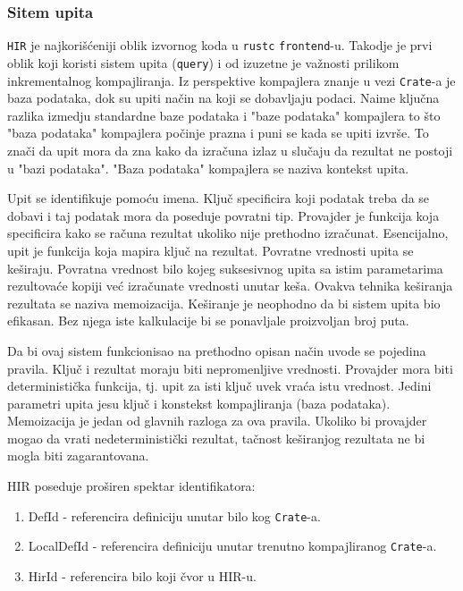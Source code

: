\documentclass[11pt]{article}
\begin{document}
\subsubsection{Sitem upita}

\verb|HIR| je najkorišćeniji oblik izvornog koda u \verb|rustc| \verb|frontend|-u. Takodje je prvi oblik koji 
koristi sistem upita (\verb|query|) i od izuzetne je važnosti prilikom inkrementalnog kompajliranja.
Iz perspektive kompajlera znanje u vezi \verb|Crate|-a je baza podataka, dok su upiti način na koji 
se dobavljaju podaci. Naime ključna razlika izmedju standardne baze podataka i "baze podataka" kompajlera
to što "baza podataka" kompajlera počinje prazna i puni se kada se upiti izvrše. To znači da upit mora 
da zna kako da izračuna izlaz u slučaju da rezultat ne postoji u "bazi podataka". "Baza podataka" kompajlera 
se naziva kontekst upita.

Upit se identifikuje pomoću imena. Ključ specificira koji podatak treba da se dobavi i taj podatak 
mora da poseduje povratni tip. Provajder je funkcija koja specificira kako se računa rezultat ukoliko nije 
prethodno izračunat. Esencijalno, upit je funkcija koja mapira ključ na rezultat. 
Povratne vrednosti upita se keširaju. Povratna vrednost bilo kojeg suksesivnog upita sa istim parametarima rezultovaće 
kopiji već izračunate vrednosti unutar keša. Ovakva tehnika keširanja rezultata se naziva memoizacija.
Keširanje je neophodno da bi sistem upita bio efikasan. Bez njega iste kalkulacije bi se ponavljale proizvoljan broj puta.

Da bi ovaj sistem funkcionisao na prethodno opisan način uvode se pojedina pravila. Ključ i rezultat 
moraju biti nepromenljive vrednosti. Provajder mora biti deterministička funkcija, tj. upit za isti ključ
uvek vraća istu vrednost. Jedini parametri upita jesu ključ i konstekst kompajliranja (baza podataka).
Memoizacija je jedan od glavnih razloga za ova pravila. Ukoliko bi provajder mogao da vrati nedeterministički rezultat,
tačnost keširanjog rezultata ne bi mogla biti zagarantovana.



HIR poseduje proširen spektar identifikatora:
\begin{enumerate}
    \item DefId - referencira definiciju unutar bilo kog \verb|Crate|-a.
    \item LocalDefId - referencira definiciju unutar trenutno kompajliranog \verb|Crate|-a.
    \item HirId - referencira bilo koji čvor u HIR-u.
\end{enumerate}
\end{document}
